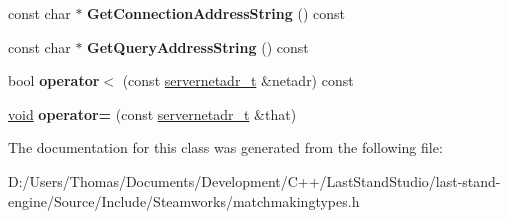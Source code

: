 \begin{DoxyCompactItemize}
\item 
\hypertarget{classservernetadr__t_afa62442009b7e929e60d0c18532463bb}{}const char $\ast$ {\bfseries Get\+Connection\+Address\+String} () const \label{classservernetadr__t_afa62442009b7e929e60d0c18532463bb}

\item 
\hypertarget{classservernetadr__t_a22e493b84a36423f6925da526ba96b5f}{}const char $\ast$ {\bfseries Get\+Query\+Address\+String} () const \label{classservernetadr__t_a22e493b84a36423f6925da526ba96b5f}

\item 
\hypertarget{classservernetadr__t_a4d70b50bcdadbdbb3ab1a1aa47ade6e5}{}bool {\bfseries operator$<$} (const \hyperlink{classservernetadr__t}{servernetadr\+\_\+t} \&netadr) const \label{classservernetadr__t_a4d70b50bcdadbdbb3ab1a1aa47ade6e5}

\item 
\hypertarget{classservernetadr__t_ac0d492466185acc12afb506520b88de9}{}\hyperlink{SDL__audio_8h_a52835ae37c4bb905b903cbaf5d04b05f}{void} {\bfseries operator=} (const \hyperlink{classservernetadr__t}{servernetadr\+\_\+t} \&that)\label{classservernetadr__t_ac0d492466185acc12afb506520b88de9}

\end{DoxyCompactItemize}


The documentation for this class was generated from the following file\+:\begin{DoxyCompactItemize}
\item 
D\+:/\+Users/\+Thomas/\+Documents/\+Development/\+C++/\+Last\+Stand\+Studio/last-\/stand-\/engine/\+Source/\+Include/\+Steamworks/matchmakingtypes.\+h\end{DoxyCompactItemize}
